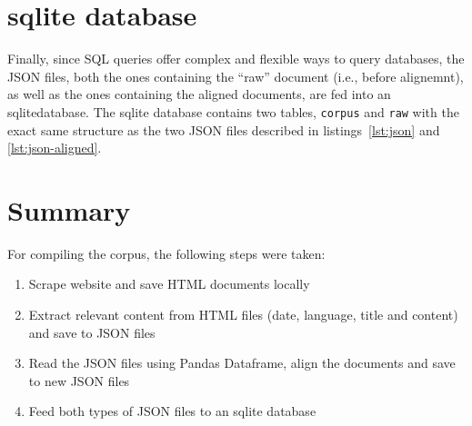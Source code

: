 \section{sqlite database}
Finally, since SQL queries offer complex and flexible ways to query databases, the JSON files, both the ones containing the \enquote{raw} document (i.e., before alignemnt), as well as the ones containing the aligned documents, are fed into an sqlite\footnotemark database. 
The sqlite database contains two tables, \texttt{corpus} and \texttt{raw} with the exact same structure as the two JSON files described in listings~\ref{lst:json} and \ref{lst:json-aligned}.


\section{Summary}
For compiling the corpus, the following steps were taken:
\begin{enumerate}
	\item Scrape website and save HTML documents locally
	\item Extract relevant content from HTML files (date, language, title and content) and save to JSON files
	\item Read the JSON files using Pandas Dataframe, align the documents and save to new JSON files
	\item Feed both types of JSON files to an sqlite database
\end{enumerate}

